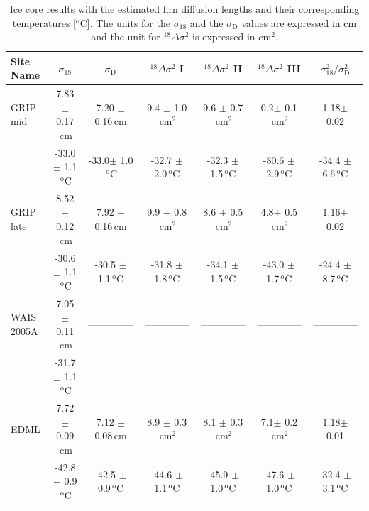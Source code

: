 \documentclass[11pt, draftcls, onecolumn]{IEEEtran} %
\numberwithin{equation}{section}
\numberwithin{table}{section}
\numberwithin{figure}{section}
\begin{document}
\begin{table}[]
	\center
	\caption{Ice core results with the estimated firn diffusion lengths and their corresponding temperatures [$^\mathrm{o}$C].
		The units for the $\sigma_{18}$ and the $\sigma_{\mathrm{D}}$ values are expressed in $\mathrm{cm}$ and the unit for ${}^{18}\Delta\sigma^2$
		is expressed in $\mathrm{cm}^2$.  }\label{tbl:icecore_results}
	\begin{tabular}{l c c c c c c} 
		\toprule
		Site Name & $\sigma_{18}$ & $\sigma_{\mathrm{D}}$ & ${}^{18}\Delta\sigma^2$  I & ${}^{18}\Delta\sigma^2$  II & ${}^{18}\Delta\sigma^2$  III & $\sigma^2_{18}/\sigma^2_{\mathrm{D}}$\\
		\midrule
		GRIP mid & 7.83 $\pm$ 0.17$\,\mathrm{cm}$& 7.20 $\pm$ 0.16$\,\mathrm{cm}$& 9.4 $\pm$ 1.0$\,\mathrm{cm}^2$& 9.6 $\pm$ 0.7$\,\mathrm{cm}^2$& 0.2$\pm$ 0.1$\,\mathrm{cm}^2$& 1.18$\pm$ 0.02\\
		& -33.0$\pm$ 1.1$\,^\mathrm{o}$C & -33.0$\pm$ 1.0$\,^\mathrm{o}$C& -32.7 $\pm$ 2.0$\,^\mathrm{o}$C& -32.3 $\pm$ 1.5$\,^\mathrm{o}$C& -80.6 $\pm$ 2.9$\,^\mathrm{o}$C& -34.4 $\pm$ 6.6$\,^\mathrm{o}$C\\
		
		GRIP late&8.52 $\pm$ 0.12$\,\mathrm{cm}$& 7.92 $\pm$ 0.16$\,\mathrm{cm}$& 9.9 $\pm$ 0.8$\,\mathrm{cm}^2$& 8.6 $\pm$ 0.5$\,\mathrm{cm}^2$& 4.8$\pm$ 0.5$\,\mathrm{cm}^2$& 1.16$\pm$ 0.02\\
		& -30.6 $\pm$ 1.1$\,^\mathrm{o}$C & -30.5 $\pm$ 1.1$\,^\mathrm{o}$C& -31.8 $\pm$ 1.8$\,^\mathrm{o}$C& -34.1 $\pm$ 1.5$\,^\mathrm{o}$C& -43.0 $\pm$ 1.7$\,^\mathrm{o}$C& -24.4 $\pm$ 8.7$\,^\mathrm{o}$C\\
		
		WAIS 2005A &7.05 $\pm$ 0.11$\,\mathrm{cm}$&--------------& --------------& --------------&--------------&--------------\\
		& -31.7 $\pm$ 1.1$\,^\mathrm{o}$C &-------------- &--------------&-------------- & --------------& --------------\\
		
		EDML &7.72 $\pm$ 0.09$\,\mathrm{cm}$& 7.12 $\pm$ 0.08$\,\mathrm{cm}$& 8.9 $\pm$ 0.3$\,\mathrm{cm}^2$& 8.1 $\pm$ 0.3$\,\mathrm{cm}^2$& 7.1$\pm$ 0.2$\,\mathrm{cm}^2$& 1.18$\pm$ 0.01\\
		& -42.8 $\pm$ 0.9$\,^\mathrm{o}$C & -42.5 $\pm$ 0.9$\,^\mathrm{o}$C& -44.6 $\pm$ 1.1$\,^\mathrm{o}$C& -45.9 $\pm$ 1.0$\,^\mathrm{o}$C& -47.6 $\pm$ 1.0$\,^\mathrm{o}$C& -32.4 $\pm$ 3.1$\,^\mathrm{o}$C\\
		

\end{tabular}
\end{table}
\end{document}
